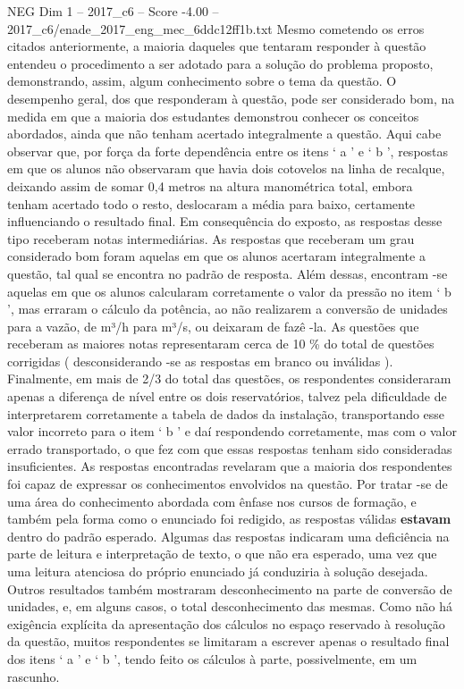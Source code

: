 \begin{textsample}{NEG Dim 1 – 2017\_c6 – Score -4.00 – 2017\_c6/enade\_2017\_eng\_mec\_6ddc12ff1b.txt}
Mesmo cometendo os erros citados anteriormente, a maioria daqueles que tentaram responder à questão entendeu o procedimento a ser adotado para a solução do problema proposto, demonstrando, assim, algum conhecimento sobre o tema da questão.
O desempenho geral, dos que responderam à questão, pode ser considerado bom, na medida em que a maioria dos estudantes demonstrou conhecer os conceitos abordados, ainda que não tenham acertado integralmente a questão.
Aqui cabe observar que, por força da forte dependência entre os itens ‘ a ’ e ‘ b ’, respostas em que os alunos não observaram que havia dois cotovelos na linha de recalque, deixando assim de somar 0,4 metros na altura manométrica total, embora tenham acertado todo o resto, deslocaram a média para baixo, certamente influenciando o resultado final.
Em consequência do exposto, as respostas desse tipo receberam notas intermediárias.
As respostas que receberam um grau considerado bom foram aquelas em que os alunos acertaram integralmente a questão, tal qual se encontra no padrão de resposta.
Além dessas, encontram -se aquelas em que os alunos calcularam corretamente o valor da pressão no item ‘ b ’, mas erraram o cálculo da potência, ao não realizarem a conversão de unidades para a vazão, de m³/h para m³/s, ou deixaram de fazê -la.
As questões que receberam as maiores notas representaram cerca de 10 \% do total de questões corrigidas ( desconsiderando -se as respostas em branco ou inválidas ).
Finalmente, em mais de 2/3 do total das questões, os respondentes consideraram apenas a diferença de nível entre os dois reservatórios, talvez pela dificuldade de interpretarem corretamente a tabela de dados da instalação, transportando esse valor incorreto para o item ‘ b ’ e daí respondendo corretamente, mas com o valor errado transportado, o que fez com que essas respostas tenham sido consideradas insuficientes.
As respostas encontradas revelaram que a maioria dos respondentes foi capaz de expressar os conhecimentos envolvidos na questão.
Por tratar -se de uma área do conhecimento abordada com ênfase nos cursos de formação, e também pela forma como o enunciado foi redigido, as respostas válidas \textbf{estavam} dentro do padrão esperado.
Algumas das respostas indicaram uma deficiência na parte de leitura e interpretação de texto, o que não era esperado, uma vez que uma leitura atenciosa do próprio enunciado já conduziria à solução desejada.
Outros resultados também mostraram desconhecimento na parte de conversão de unidades, e, em alguns casos, o total desconhecimento das mesmas.
Como não há exigência explícita da apresentação dos cálculos no espaço reservado à resolução da questão, muitos respondentes se limitaram a escrever apenas o resultado final dos itens ‘ a ’ e ‘ b ’, tendo feito os cálculos à parte, possivelmente, em um rascunho.

\end{textsample}
